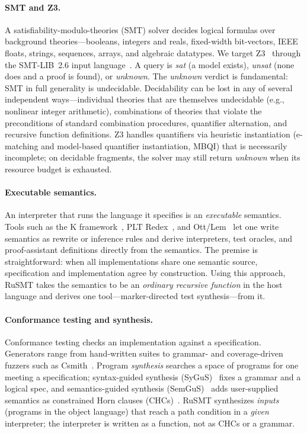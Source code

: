 \documentclass[11pt,a4paper]{article}
\theoremstyle{definition}
\theoremstyle{remark}
\newcommand{\rusmt}{RuSMT}
\begin{document}
\paragraph{SMT and Z3.}
A satisfiability-modulo-theories (SMT) solver decides logical formulas over background
theories---booleans, integers and reals, fixed-width bit-vectors, IEEE floats,
strings, sequences, arrays, and algebraic datatypes. We target
Z3~\cite{demoura2008z3} through the SMT-LIB~2.6 input
language~\cite{barrett2017smtlib}. A query is \emph{sat} (a model exists),
\emph{unsat} (none does and a proof is found), or
\emph{unknown}. The \emph{unknown} verdict is fundamental: SMT in full
generality is undecidable. Decidability can be lost in any of several
independent ways---individual theories that are themselves undecidable
(e.g., nonlinear integer arithmetic), combinations of theories that violate
the preconditions of standard combination procedures, quantifier alternation,
and recursive function definitions. Z3 handles quantifiers via heuristic
instantiation (e-matching and model-based quantifier instantiation, MBQI)
that is necessarily incomplete; on decidable fragments, the solver may still
return \emph{unknown} when its resource budget is exhausted.


\paragraph{Executable semantics.}
An interpreter that runs the language it specifies is an \emph{executable}
semantics. Tools such as the K framework~\cite{rosu2010k}, PLT
Redex~\cite{felleisen2009redex}, and Ott/Lem~\cite{sewell2007ott,mulligan2014lem}
let one write semantics as rewrite or inference rules and derive interpreters,
test oracles, and proof-assistant definitions directly from the semantics. The premise is straightforward: when all implementations share one semantic source, specification and implementation agree by 
construction. Using this approach, \rusmt{} takes the semantics to be an \emph{ordinary recursive function} in the host language and derives one tool---marker-directed test synthesis---from it.

\paragraph{Conformance testing and synthesis.}
Conformance testing checks an implementation against a specification. Generators
range from hand-written suites to grammar- and coverage-driven fuzzers such as
Csmith~\cite{yang2011csmith}. Program \emph{synthesis} searches a space of
programs for one meeting a specification; syntax-guided synthesis
(SyGuS)~\cite{alur2013sygus} fixes a grammar and a logical spec, and
semantics-guided synthesis (SemGuS)~\cite{kim2021semgus} adds user-supplied
semantics as constrained Horn clauses (CHCs)~\cite{bjorner2015horn}. \rusmt{}
synthesizes \emph{inputs} (programs in the object language) that reach a path condition in
a \emph{given} interpreter; the interpreter is written as a function, not as CHCs
or a grammar.
\end{document}
